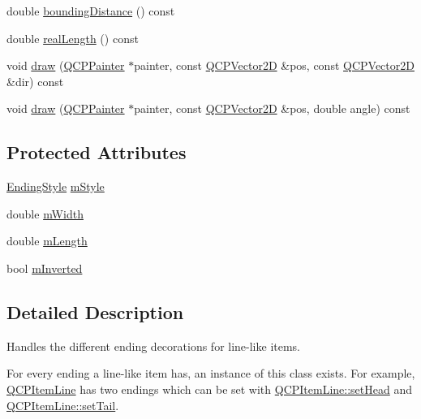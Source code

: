 \begin{DoxyCompactItemize}
double \hyperlink{class_q_c_p_line_ending_a14fe390ddd590864ac66a60ed5278df5}{bounding\+Distance} () const
\item 
double \hyperlink{class_q_c_p_line_ending_acacd24d386d459b282d3c57f16a5405d}{real\+Length} () const
\item 
void \hyperlink{class_q_c_p_line_ending_a4f45db54f2aba03acf055e29aec1e8e7}{draw} (\hyperlink{class_q_c_p_painter}{Q\+C\+P\+Painter} $\ast$painter, const \hyperlink{class_q_c_p_vector2_d}{Q\+C\+P\+Vector2D} \&pos, const \hyperlink{class_q_c_p_vector2_d}{Q\+C\+P\+Vector2D} \&dir) const
\item 
void \hyperlink{class_q_c_p_line_ending_af7ac30a81ba85b9bded148c6ec387391}{draw} (\hyperlink{class_q_c_p_painter}{Q\+C\+P\+Painter} $\ast$painter, const \hyperlink{class_q_c_p_vector2_d}{Q\+C\+P\+Vector2D} \&pos, double angle) const
\end{DoxyCompactItemize}
\subsection*{Protected Attributes}
\begin{DoxyCompactItemize}
\item 
\hyperlink{class_q_c_p_line_ending_a5ef16e6876b4b74959c7261d8d4c2cd5}{Ending\+Style} \hyperlink{class_q_c_p_line_ending_a4696fc9117b60f1ca7690fcd2ba56611}{m\+Style}
\item 
double \hyperlink{class_q_c_p_line_ending_aca89d21341133c20dc6825c33a5eac48}{m\+Width}
\item 
double \hyperlink{class_q_c_p_line_ending_ae8e1e2566b96c05736cd92662dba8af8}{m\+Length}
\item 
bool \hyperlink{class_q_c_p_line_ending_a91306fe771d54c955e0af21af14349d5}{m\+Inverted}
\end{DoxyCompactItemize}


\subsection{Detailed Description}
Handles the different ending decorations for line-\/like items. 

 For every ending a line-\/like item has, an instance of this class exists. For example, \hyperlink{class_q_c_p_item_line}{Q\+C\+P\+Item\+Line} has two endings which can be set with \hyperlink{class_q_c_p_item_line_aebf3d687114d584e0459db6759e2c3c3}{Q\+C\+P\+Item\+Line\+::set\+Head} and \hyperlink{class_q_c_p_item_line_ac264222c3297a7efe33df9345c811a5f}{Q\+C\+P\+Item\+Line\+::set\+Tail}.

